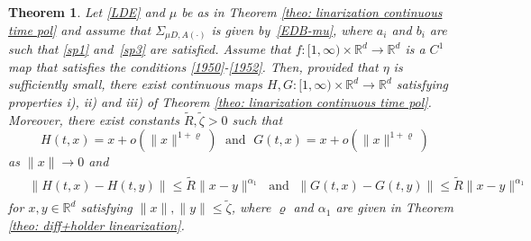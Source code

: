 \documentclass[reqno, a4paper, 10pt]{amsart}
\theoremstyle{plain}
\numberwithin{equation}{section}
\newtheorem{theorem}{Theorem}
\theoremstyle{remark}
\def\R{\mathbb{R}}
\begin{document}
\begin{theorem}\label{theo: diff+holder linearization continuous}
Let \eqref{LDE} and $\mu$ be as in Theorem {\rm\ref{theo: linarization continuous time pol}} and assume that $\Sigma_{\mu D, A(\cdot)}$ is given by~\eqref{EDB-mu}, where $a_i$ and $b_i$ are such that \eqref{sp1} and~\eqref{sp3} are satisfied. Assume that $f\colon [1, \infty)\times \R^d \to \R^d$ is a $C^1$ map that satisfies the conditions \eqref{1950}-\eqref{1952}. Then, provided that $\eta$ is sufficiently small, there exist continuous maps $H, G\colon [1, \infty) \times \R^d \to \R^d$ satisfying properties i), ii) and iii) of Theorem {\rm \ref{theo: linarization continuous time pol}}.
Moreover, there exist constants $\tilde R,\tilde \zeta>0$ such that 
\begin{equation}\label{eq: H is diff 0 cont}
H(t,x)=x+o(\|x\|^{1+\varrho})\; \text{ and }\;
G(t,x)=x+ o(\|x\|^{1+ \varrho})
\end{equation}
as $\|x\|\to 0$ and
\begin{align}\label{eq: H and G are holder}
\begin{split}
&\|H(t,x)-H(t,y)\| \leq \tilde R \|x-y\|^{\alpha_1}\; \text{ and }\; \|G(t,x)-G(t,y)\| \leq  \tilde R  \|x-y\|^{\alpha_1}
\end{split}
\end{align}
for $x,y\in\mathbb{R}^d$ satisfying $\|x\|,\|y\|\le \tilde \zeta $, where $\varrho$ and $\alpha_1$ are given in Theorem \ref{theo: diff+holder linearization}.
\end{theorem}
\end{document}
